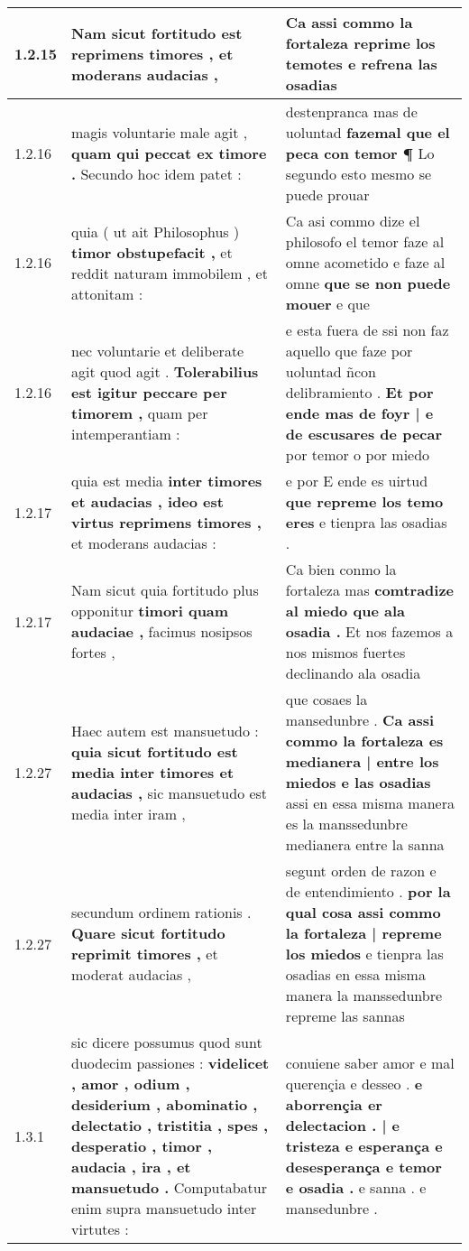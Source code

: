 \begin{tabular}{|p{1cm}|p{6.5cm}|p{6.5cm}|}
1.2.15 & Nam sicut fortitudo est \textbf{ reprimens timores , } et moderans audacias , & Ca assi commo la fortaleza \textbf{ reprime los temotes } e refrena las osadias \\\hline
1.2.16 & magis voluntarie male agit , \textbf{ quam qui peccat ex timore . } Secundo hoc idem patet : & destenpranca mas de uoluntad \textbf{ fazemal que el peca con temor ¶ } Lo segundo esto mesmo se puede prouar \\\hline
1.2.16 & quia ( ut ait Philosophus ) \textbf{ timor obstupefacit , } et reddit naturam immobilem , et attonitam : & Ca asi commo dize el philosofo el temor faze al omne acometido e faze al omne \textbf{ que se non puede mouer } e que \\\hline
1.2.16 & nec voluntarie et deliberate agit quod agit . \textbf{ Tolerabilius est igitur peccare per timorem , } quam per intemperantiam : & e esta fuera de ssi non faz aquello que faze por uoluntad ñcon delibramiento . \textbf{ Et por ende mas de foyr | e de escusares de pecar } por temor o por miedo \\\hline
1.2.17 & quia est media \textbf{ inter timores et audacias , ideo est virtus reprimens timores , } et moderans audacias : & e por E ende es uirtud \textbf{ que repreme los temo eres } e tienpra las osadias . \\\hline
1.2.17 & Nam sicut quia fortitudo plus opponitur \textbf{ timori quam audaciae , } facimus nosipsos fortes , & Ca bien conmo la fortaleza mas \textbf{ comtradize al miedo que ala osadia . } Et nos fazemos a nos mismos fuertes declinando ala osadia \\\hline
1.2.27 & Haec autem est mansuetudo : \textbf{ quia sicut fortitudo est media inter timores et audacias , } sic mansuetudo est media inter iram , & que cosaes la mansedunbre . \textbf{ Ca assi commo la fortaleza es medianera | entre los miedos e las osadias } assi en essa misma manera es la manssedunbre medianera entre la sanna \\\hline
1.2.27 & secundum ordinem rationis . \textbf{ Quare sicut fortitudo reprimit timores , } et moderat audacias , & segunt orden de razon e de entendimiento . \textbf{ por la qual cosa assi commo la fortaleza | repreme los miedos } e tienpra las osadias en essa misma manera la manssedunbre repreme las sannas \\\hline
1.3.1 & sic dicere possumus quod sunt duodecim passiones : \textbf{ videlicet , amor , odium , desiderium , abominatio , delectatio , tristitia , spes , desperatio , timor , audacia , ira , et mansuetudo . } Computabatur enim supra mansuetudo inter virtutes : & conuiene saber amor e mal querençia e desseo . \textbf{ e aborrençia er delectacion . | e tristeza e esperança e desesperança e temor e osadia . } e sanna . e mansedunbre . \\\hline

\end{tabular}
